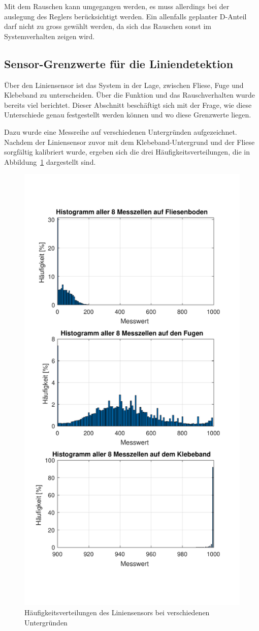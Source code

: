 \documentclass[main.tex]{subfiles} %
\begin{document}
Mit dem Rauschen kann umgegangen werden, es muss allerdings bei der auslegung
des Reglers berücksichtigt werden. Ein allenfalls geplanter D-Anteil darf nicht
zu gross gewählt werden, da sich das Rauschen sonst im Systemverhalten zeigen
wird.

\subsection*{Sensor-Grenzwerte für die Liniendetektion}\label{apdx:Liniensensor_Liniendetektion}

Über den Liniensensor ist das System in der Lage, zwischen Fliese, Fuge und Klebeband
zu unterscheiden. Über die Funktion und das Rauschverhalten wurde bereits viel
berichtet. Dieser Abschnitt beschäftigt sich mit der Frage, wie diese Unterschiede genau
festgestellt werden können und wo diese Grenzwerte liegen.

Dazu wurde eine Messreihe auf verschiedenen Untergründen aufgezeichnet. Nachdem
der Liniensensor zuvor mit dem Klebeband-Untergrund und der Fliese sorgfältig
kalibriert wurde, ergeben sich die drei Häufigkeitsverteilungen, die in
Abbildung~\ref{fig:Histogramme_LineSensor} dargestellt sind.

\begin{figure}[H]
    \centering
    \includegraphics[width=0.5\linewidth]{fig_Parametrierung_Linienfolgeregler/Histogramme_Liniensensor.pdf}
    \caption{Häufigkeitsverteilungen des Liniensensors bei verschiedenen Untergründen}\label{fig:Histogramme_LineSensor}
\end{figure}
\end{document}
